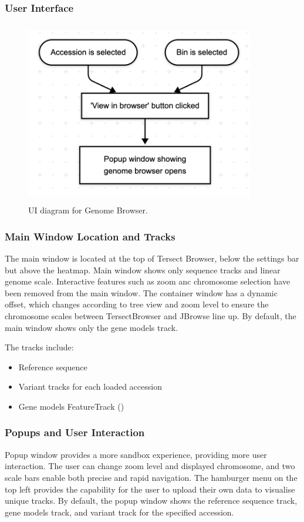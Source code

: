 \documentclass[12pt]{article}
\begin{document}
\subsubsection{User Interface}
\begin{figure}[h]
    \centering
    \includegraphics[width=10cm, height=8cm]{GenomeBrowser.png}
    \caption{UI diagram for Genome Browser.}
\end{figure}

\subsubsection{Main Window Location and Tracks}
The main window is located at the top of Tersect Browser, below the settings bar but above the heatmap. Main window shows only sequence tracks and linear genome scale. Interactive features such as zoom anc chromosome selection have been removed from the main window. The container window has a dynamic offset, which changes according to tree view and zoom level to ensure the chromosome scales between TersectBrowser and JBrowse line up. By default, the main window shows only the gene models track. 

The tracks include: 
\begin{itemize}
    \item Reference sequence 
    \item Variant tracks for each loaded accession
    \item Gene models FeatureTrack ()
\end{itemize}

\subsubsection{Popups and User Interaction}
Popup window provides a more sandbox experience, providing more user interaction. The user can change zoom level and displayed chromosome, and two scale bars enable both precise and rapid navigation. The hamburger menu on the top left provides the capability for the user to upload their own data to visualise unique tracks.
By default, the popup window shows the reference sequence track, gene models track, and variant track for the specified accession.
\end{document}
